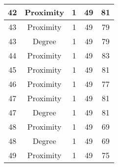 \documentclass[results.tex]{subfiles}
\begin{document}
\begin{center}
\begin{tabular}{| c || c | c | c | c |}
            \hline
            42                      & Proximity                    & 1                      & 49                      & 81                   \\
            \hline
            43                      & Proximity                    & 1                      & 49                      & 79                   \\
            \hline
            43                      & Degree                       & 1                      & 49                      & 79                   \\
            \hline
            44                      & Proximity                    & 1                      & 49                      & 83                   \\
            \hline
            45                      & Proximity                    & 1                      & 49                      & 81                   \\
            \hline
            46                      & Proximity                    & 1                      & 49                      & 77                   \\
            \hline
            47                      & Proximity                    & 1                      & 49                      & 81                   \\
            \hline
            47                      & Degree                       & 1                      & 49                      & 81                   \\
            \hline
            48                      & Proximity                    & 1                      & 49                      & 69                   \\
            \hline
            48                      & Degree                       & 1                      & 49                      & 69                   \\
            \hline
            49                      & Proximity                    & 1                      & 49                      & 75                   \\
            \hline
        \end{tabular}
    \end{center}
\end{document}
